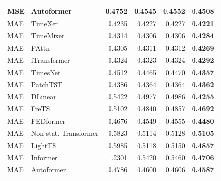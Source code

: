 \begin{longtable}{llrrrr}
MSE & Autoformer & 0.4752 & 0.4545 & 0.4552 & \textbf{0.4508} \\
\midrule
MAE & TimeXer & 0.4235 & 0.4227 & 0.4227 & \textbf{0.4221} \\
MAE & TimeMixer & 0.4314 & 0.4306 & 0.4306 & \textbf{0.4284} \\
MAE & PAttn & 0.4305 & 0.4311 & 0.4312 & \textbf{0.4269} \\
MAE & iTransformer & 0.4324 & 0.4323 & 0.4324 & \textbf{0.4292} \\
MAE & TimesNet & 0.4512 & 0.4465 & 0.4470 & \textbf{0.4357} \\
MAE & PatchTST & 0.4386 & 0.4364 & 0.4364 & \textbf{0.4362} \\
MAE & DLinear & 0.5422 & 0.4977 & 0.4986 & \textbf{0.4255} \\
MAE & FreTS & 0.5102 & 0.4840 & 0.4857 & \textbf{0.4692} \\
MAE & FEDformer & 0.4676 & 0.4549 & 0.4555 & \textbf{0.4480} \\
MAE & Non-stat. Transformer & 0.5823 & 0.5114 & 0.5128 & \textbf{0.5105} \\
MAE & LightTS & 0.5985 & 0.5118 & 0.5150 & \textbf{0.4857} \\
MAE & Informer & 1.2301 & 0.5420 & 0.5460 & \textbf{0.4706} \\
MAE & Autoformer & 0.4786 & 0.4600 & 0.4606 & \textbf{0.4587} \\
\end{longtable}
\endgroup

